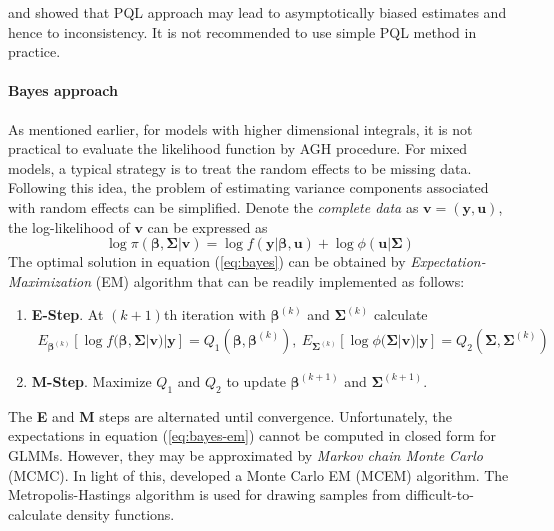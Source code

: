 \citet{breslow1995bias}  and \citet{pinheiro2006efficient} showed that PQL approach may lead to
asymptotically biased estimates and hence to inconsistency. It is not recommended to use simple PQL
method in practice. 


\paragraph{Bayes approach}
As mentioned earlier, for models with higher dimensional integrals, it is not practical to
evaluate the likelihood function by AGH procedure. For mixed models, a typical strategy is to treat
the random effects to be missing data. Following this idea, the problem of estimating variance
components associated with random effects can be simplified. Denote the \textit{complete data} as
$\bm v = (\bm y, \bm u)$, the log-likelihood of $\bm v$ can be expressed as 
\begin{equation}\label{eq:bayes}
	\log \pi(\bm \beta , \bm \Sigma|\bm v) = \log f(\bm y|\bm \beta, \bm u) + \log \phi(\bm u|\bm
	\Sigma)
\end{equation}  
The optimal solution in equation (\ref{eq:bayes}) can be obtained by
\textit{Expectation-Maximization} (EM) algorithm that can be readily implemented as follows:
\begin{enumerate}
	\item \textbf{E-Step}. At $(k+1)$th iteration with $\bm \beta^{(k)}$ and $\bm\Sigma^{(k)}$  
	calculate 
	\begin{equation}\label{eq:bayes-em}
		\begin{aligned}
			E_{\bm \beta^{(k)}}[\log f(\bm \beta , \bm \Sigma|\bm v)|\bm y]= Q_1(\bm \beta, \bm \beta^{(k)}),
			~
			E_{\bm \Sigma^{(k)}}[\log \phi(\bm \Sigma|\bm v)|\bm y]= Q_2(\bm \Sigma, \bm \Sigma^{(k)})
		\end{aligned}
	\end{equation}
	\item \textbf{M-Step}. Maximize $Q_1$ and $Q_2$ to update  $\bm \beta^{(k+1)}$ and
	$\bm\Sigma^{(k+1)}$.
\end{enumerate}
The \textbf{E} and \textbf{M} steps are alternated until convergence. Unfortunately, the
expectations in equation (\ref{eq:bayes-em}) cannot be computed in closed form for GLMMs. However,
they may be approximated by \textit{Markov chain Monte Carlo} (MCMC). In light of this,
\citet{mcculloch1997maximum} developed a Monte Carlo EM (MCEM) algorithm. The Metropolis-Hastings
algorithm is used for drawing samples from difficult-to-calculate density functions.

